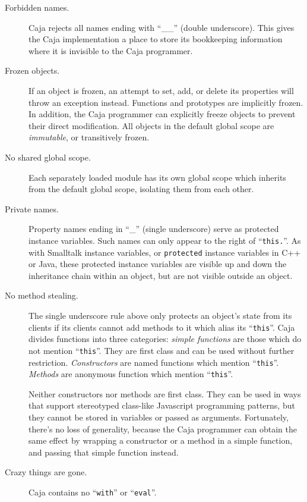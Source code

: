 \documentclass[letterpaper,twocolumn,10pt]{article}
\newcommand{\code}[1]{{\tt {#1}}}              %
\begin{document}
\begin{description}

  \item[Forbidden names.] Caja rejects all names ending with ``\_\_'' (double 
  underscore). This gives the Caja implementation a place to store its 
  bookkeeping information where it is invisible to the Caja programmer.
  
  \item[Frozen objects.] If an object is frozen, an attempt to set, add, or 
  delete its properties will throw an exception instead. Functions and 
  prototypes are implicitly frozen. In addition, the Caja programmer can 
  explicitly freeze objects to prevent their direct modification. All objects 
  in the default global scope are \emph{immutable}, or transitively frozen.
  
  \item[No shared global scope.] Each separately loaded module has its own
  global scope which inherits from the default global scope, isolating them
  from each other.

  \item[Private names.] Property names ending in ``\_'' (single underscore) 
  serve as protected instance variables. Such names can only appear to the 
  right of ``\code{this.}''. As with Smalltalk instance variables, or 
  \code{protected} instance variables in C++ or Java, these protected 
  instance variables are visible up and down the inheritance chain within an 
  object, but are not visible outside an object.
  
  \item[No method stealing.] The single underscore rule above only protects 
  an object's state from its clients if its clients cannot add methods to it 
  which alias its ``\code{this}''. Caja divides functions into three 
  categories: \emph{simple functions} are those which do not mention 
  ``\code{this}''. They are first class and can be used without further 
  restriction. \emph{Constructors} are named functions which mention 
  ``\code{this}''. \emph{Methods} are anonymous function which mention 
  ``\code{this}''.

  Neither constructors nor methods are first class. They can be used in ways 
  that support stereotyped class-like Javascript programming patterns, but 
  they cannot be stored in variables or passed as arguments. Fortunately, 
  there's no loss of generality, because the Caja programmer can obtain the 
  same effect by wrapping a constructor or a method in a simple function, and 
  passing that simple function instead.
  
  \item[Crazy things are gone.] Caja contains no ``\code{with}'' or 
  ``\code{eval}''.
  
\end{description}
\end{document}
